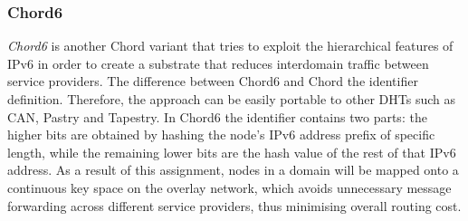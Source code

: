 \subsubsection{Chord6}
\emph{Chord6} \cite{xiong_chord6_2005} is another Chord variant that tries to
exploit the hierarchical features of IPv6 in order to create a substrate that
reduces interdomain traffic between service providers. The difference between
Chord6 and Chord the identifier definition. Therefore, the approach can be
easily portable to other DHTs such as CAN, Pastry and Tapestry. In Chord6 the
identifier contains two parts: the higher bits are obtained by hashing the
node's IPv6 address prefix of specific length, while the remaining lower bits
are the hash value of the rest of that IPv6 address. As a result of this
assignment, nodes in a domain will be mapped onto a continuous key space on the
overlay network, which avoids unnecessary message forwarding across different
service providers, thus minimising overall routing cost.

%





